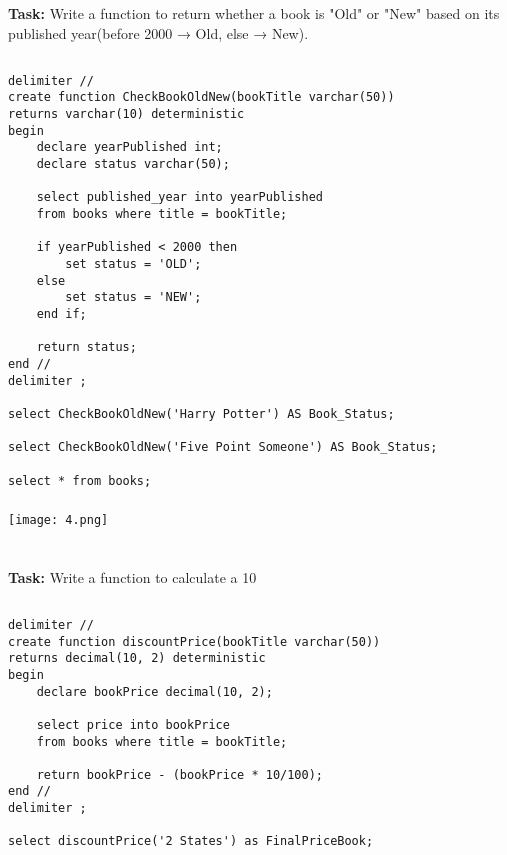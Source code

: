 \documentclass[12pt,a4paper]{article}
\begin{document}

\section{}
\textbf{Task:} Write a function to return whether a book is "Old" or "New" based on its published year(before 2000 → Old, else → New).

\subsection{}
\begin{lstlisting}
delimiter //
create function CheckBookOldNew(bookTitle varchar(50))
returns varchar(10) deterministic
begin
	declare yearPublished int;
    declare status varchar(50);
    
    select published_year into yearPublished
    from books where title = bookTitle;
    
    if yearPublished < 2000 then
		set status = 'OLD';
	else
		set status = 'NEW';
	end if;
    
    return status;
end //
delimiter ;

select CheckBookOldNew('Harry Potter') AS Book_Status;

select CheckBookOldNew('Five Point Someone') AS Book_Status;

select * from books;
\end{lstlisting}

\subsubsection{}
\begin{center}
    \texttt{[image: 4.png]}
\end{center}


\section{}
\textbf{Task:} Write a function to calculate a 10%

\subsection{}
\begin{lstlisting}
delimiter //
create function discountPrice(bookTitle varchar(50))
returns decimal(10, 2) deterministic
begin
	declare bookPrice decimal(10, 2);
    
    select price into bookPrice
    from books where title = bookTitle;
    
    return bookPrice - (bookPrice * 10/100);
end //
delimiter ;

select discountPrice('2 States') as FinalPriceBook;
\end{lstlisting}
\end{document}
